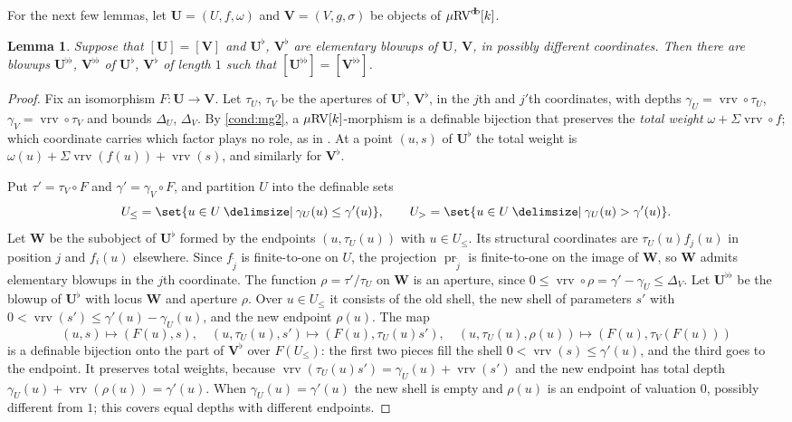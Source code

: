 \documentclass[12pt]{amsart}
\newcommand{\memph}[1]{{\color{magenta}\emph{#1}}}
\theoremstyle{plain}
\newtheorem{lem}[thm]{Lemma}
\theoremstyle{definition}
\theoremstyle{remark}
\numberwithin{equation}{section}
\theoremstyle{plain}
\newcommand{\RV}{\textup{RV}}
\DeclareMathOperator{\pr}{pr}
\newcommand{\0}{\emptyset}
\newcommand{\fun}{\longrightarrow}
\newcommand{\efun}{\longmapsto}
\providecommand\given{}
\newcommand\SetSymbol[1][]{%
\nonscript \: #1 \vert
\allowbreak
\nonscript\:
\mathopen{}}
\renewcommand\given{\SetSymbol[\delimsize]}
\newcommand{\mRV}{{\mu}{\RV}}
\DeclareMathOperator{\vrv}{vrv}
\DeclareMathOperator{\db}{d \! b}
\begin{document}
For the next few lemmas, let $\bm U = (U, f, \omega)$ and $\bm V = (V, g, \sigma)$ be objects of $\mRV^{\db}[k]$.


\begin{lem}\label{elementary:blowups:preserves:iso:vol}
Suppose that $[\bm U] = [\bm V]$ and $\bm U^{\flat}$, $\bm V^{\flat}$ are elementary blowups of $\bm U$, $\bm V$, in possibly different coordinates. Then there are  blowups $\bm U^{\flat\flat}$, $\bm V^{\flat\flat}$ of $\bm U^{\flat}$, $\bm V^{\flat}$ of length $1$ such that $[\bm U^{\flat\flat}] = [\bm V^{\flat\flat}]$.
\end{lem}
\begin{proof}
Fix an isomorphism $F : \bm U \fun \bm V$. Let $\tau_U$, $\tau_V$ be the apertures of $\bm U^{\flat}$, $\bm V^{\flat}$, in the $j$th and $j'$th coordinates, with depths $\gamma_U = \vrv \circ \tau_U$, $\gamma_V = \vrv \circ \tau_V$ and bounds $\Delta_U$, $\Delta_V$. By \eqref{cond:mg2}, a $\mRV[k]$-morphism is a definable bijection that preserves the \memph{total weight} $\omega + \Sigma \vrv \circ f$; which coordinate carries which factor plays no role, as in \cite[Lemma~6.3]{Yin:int:acvf}. At a point $(u, s)$ of $\bm U^{\flat}$ the total weight is $\omega(u) + \Sigma \vrv(f(u)) + \vrv(s)$, and similarly for $\bm V^{\flat}$.

Put $\tau' = \tau_V \circ F$ and $\gamma' = \gamma_V \circ F$, and partition $U$ into the definable sets
\[
U_{\leq} = \set{u \in U \given \gamma_U(u) \leq \gamma'(u)}, \qquad U_{>} = \set{u \in U \given \gamma_U(u) > \gamma'(u)}.
\]
Let $\bm W$ be the subobject of $\bm U^{\flat}$ formed by the endpoints $(u, \tau_U(u))$ with $u \in U_{\leq}$. Its structural coordinates are $\tau_U(u) f_j(u)$ in position $j$ and $f_i(u)$ elsewhere. Since $f_{\tilde j}$ is finite-to-one on $U$, the projection $\pr_{\tilde j}$ is finite-to-one on the image of $\bm W$, so $\bm W$ admits elementary blowups in the $j$th coordinate. The function $\rho = \tau'/\tau_U$ on $\bm W$ is an aperture, since $0 \leq \vrv \circ \rho = \gamma' - \gamma_U \leq \Delta_V$. Let $\bm U^{\flat\flat}$ be the blowup of $\bm U^{\flat}$ with locus $\bm W$ and aperture $\rho$. Over $u \in U_{\leq}$ it consists of the old shell, the new shell of parameters $s'$ with $0 < \vrv(s') \leq \gamma'(u) - \gamma_U(u)$, and the new endpoint $\rho(u)$. The map
\[
(u, s) \efun (F(u), s), \quad (u, \tau_U(u), s') \efun (F(u), \tau_U(u) s'), \quad (u, \tau_U(u), \rho(u)) \efun (F(u), \tau_V(F(u)))
\]
is a definable bijection onto the part of $\bm V^{\flat}$ over $F(U_{\leq})$: the first two pieces fill the shell $0 < \vrv(s) \leq \gamma'(u)$, and the third goes to the endpoint. It preserves total weights, because $\vrv(\tau_U(u) s') = \gamma_U(u) + \vrv(s')$ and the new endpoint has total depth $\gamma_U(u) + \vrv(\rho(u)) = \gamma'(u)$. When $\gamma_U(u) = \gamma'(u)$ the new shell is empty and $\rho(u)$ is an endpoint of valuation $0$, possibly different from $1$; this covers equal depths with different endpoints.


\end{proof}
\end{document}
